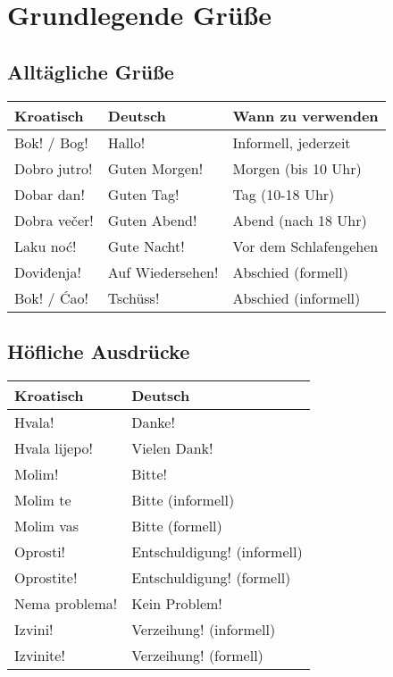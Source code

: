 \section{Grundlegende Grüße}

\begin{vocabulary}
\subsection*{Alltägliche Grüße}

\begin{center}
\begin{tabular}{lll}
\toprule
Kroatisch & Deutsch & Wann zu verwenden \\
\midrule
Bok! / Bog! & Hallo! & Informell, jederzeit \\
Dobro jutro! & Guten Morgen! & Morgen (bis 10 Uhr) \\
Dobar dan! & Guten Tag! & Tag (10-18 Uhr) \\
Dobra večer! & Guten Abend! & Abend (nach 18 Uhr) \\
Laku noć! & Gute Nacht! & Vor dem Schlafengehen \\
Doviđenja! & Auf Wiedersehen! & Abschied (formell) \\
Bok! / Ćao! & Tschüss! & Abschied (informell) \\
\bottomrule
\end{tabular}
\end{center}

\subsection*{Höfliche Ausdrücke}

\begin{center}
\begin{tabular}{ll}
\toprule
Kroatisch & Deutsch \\
\midrule
Hvala! & Danke! \\
Hvala lijepo! & Vielen Dank! \\
Molim! & Bitte! \\
Molim te & Bitte (informell) \\
Molim vas & Bitte (formell) \\
Oprosti! & Entschuldigung! (informell) \\
Oprostite! & Entschuldigung! (formell) \\
Nema problema! & Kein Problem! \\
Izvini! & Verzeihung! (informell) \\
Izvinite! & Verzeihung! (formell) \\
\bottomrule
\end{tabular}
\end{center}


\end{vocabulary}
